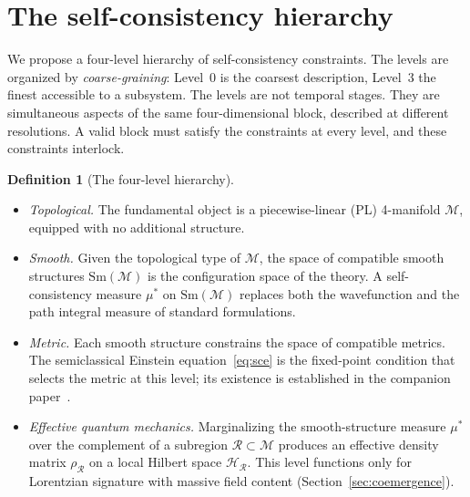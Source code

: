 \documentclass[12pt,a4paper]{article}
\theoremstyle{definition}
\newtheorem{definition}{Definition}
\theoremstyle{remark}
\begin{document}
\section{The self-consistency hierarchy}
\label{sec:hierarchy}

We propose a four-level hierarchy of self-consistency constraints. The
levels are organized by \emph{coarse-graining}: Level~0 is the coarsest
description, Level~3 the finest accessible to a subsystem. The levels
are not temporal stages. They are simultaneous aspects of the same
four-dimensional block, described at different resolutions. A valid block
must satisfy the constraints at every level, and these constraints
interlock.

\begin{definition}[The four-level hierarchy]
\label{def:hierarchy}
\quad
\begin{itemize}
\item[\emph{Level 0.}] \emph{Topological.} The fundamental object is a
piecewise-linear (PL) 4-manifold $\mathcal{M}$, equipped with no
additional structure.

\item[\emph{Level 1.}] \emph{Smooth.} Given the topological type of
$\mathcal{M}$, the space of compatible smooth structures
$\mathrm{Sm}(\mathcal{M})$ is the configuration space of the theory. A
self-consistency measure $\mu^*$ on $\mathrm{Sm}(\mathcal{M})$ replaces
both the wavefunction and the path integral measure of standard
formulations.

\item[\emph{Level 2.}] \emph{Metric.} Each smooth structure constrains
the space of compatible metrics. The semiclassical Einstein
equation~\eqref{eq:sce} is the fixed-point condition that selects the
metric at this level; its existence is established in the companion
paper~\cite{fixed_point}.

\item[\emph{Level 3.}] \emph{Effective quantum mechanics.} Marginalizing
the smooth-structure measure $\mu^*$ over the complement of a subregion
$\mathcal{R} \subset \mathcal{M}$ produces an effective density matrix
$\rho_\mathcal{R}$ on a local Hilbert space
$\mathcal{H}_\mathcal{R}$. This level functions only for Lorentzian
signature with massive field content (Section~\ref{sec:coemergence}).
\end{itemize}
\end{definition}
\end{document}
